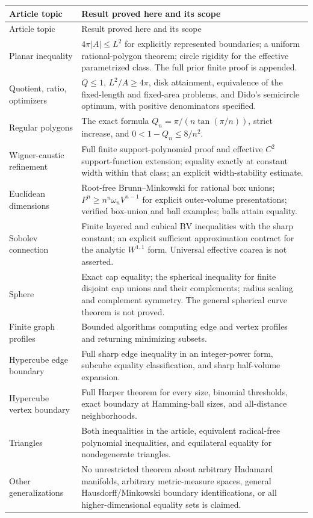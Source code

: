 \documentclass[11pt,a4paper]{article}
\theoremstyle{definition}
\begin{document}
\begin{longtable}{@{}p{}p{}@{}}
\toprule
Article topic & Result proved here and its scope\\
\midrule
\endfirsthead
\toprule Article topic & Result proved here and its scope\\\midrule
\endhead
Planar inequality & \(4\pi|A|\leq L^2\) for explicitly represented
boundaries; a uniform rational-polygon theorem; circle rigidity for the
effective parametrized class. The full prior finite proof is appended.\\[3pt]
Quotient, ratio, optimizers & \(Q\leq1\), \(L^2/A\geq4\pi\),
disk attainment, equivalence of the fixed-length and fixed-area problems,
and Dido's semicircle optimum, with positive denominators specified.\\[3pt]
Regular polygons & The exact formula \(Q_n=\pi/(n\tan(\pi/n))\),
strict increase, and \(0<1-Q_n\leq8/n^2\).\\[3pt]
Wigner-caustic refinement & Full finite support-polynomial proof and
effective \(C^2\) support-function extension; equality exactly at constant
width within that class; an explicit width-stability estimate.\\[3pt]
Euclidean dimensions & Root-free Brunn--Minkowski for rational box unions;
\(P^n\geq n^n\omega_nV^{n-1}\) for explicit outer-volume presentations;
verified box-union and ball examples; balls attain equality.\\[3pt]
Sobolev connection & Finite layered and cubical BV inequalities with the
sharp constant; an explicit sufficient approximation contract for the
analytic \(W^{1,1}\) form. Universal effective coarea is not asserted.\\[3pt]
Sphere & Exact cap equality; the spherical inequality for finite disjoint
cap unions and their complements; radius scaling and complement symmetry.
The general spherical curve theorem is not proved.\\[3pt]
Finite graph profiles & Bounded algorithms computing edge and vertex
profiles and returning minimizing subsets.\\[3pt]
Hypercube edge boundary & Full sharp edge inequality in an integer-power
form, subcube equality classification, and sharp half-volume expansion.\\[3pt]
Hypercube vertex boundary & Full Harper theorem for every size, binomial
thresholds, exact boundary at Hamming-ball sizes, and all-distance
neighborhoods.\\[3pt]
Triangles & Both inequalities in the article, equivalent radical-free
polynomial inequalities, and equilateral equality for nondegenerate
triangles.\\[3pt]
Other generalizations & No unrestricted theorem about arbitrary Hadamard
manifolds, arbitrary metric-measure spaces, general Hausdorff/Minkowski
boundary identifications, or all higher-dimensional equality sets is
claimed.\\
\bottomrule
\end{longtable}
\end{document}
